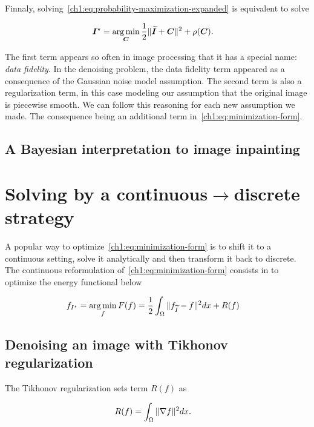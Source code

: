 Finnaly, solving~\cref{ch1:eq:probability-maximization-expanded} is equivalent to solve

\begin{align}
	\bm{I}^{\star} &= \operatorname*{arg\,min} _{\bm{C}} \frac{1}{2}\lVert\bm{\widetilde{I}} + \bm{C}\rVert^2 + \rho(\bm{C}).
	\label{ch1:eq:minimization-form}
\end{align}

The first term appears so often in image processing that it has a special name: \emph{data fidelity}. In the denoising problem, the data fidelity term appeared as a consequence of the Gaussian noise model assumption. The second term is also a regularization term, in this case modeling our assumption that the original image is piecewise smooth. We can follow this reasoning for each new assumption we made. The consequence being an additional term in~\cref{ch1:eq:minimization-form}.

\subsection{A Bayesian interpretation to image inpainting}

\section{Solving by a continuous$\rightarrow$discrete strategy }

A popular way to optimize~\cref{ch1:eq:minimization-form} is to shift it to a continuous setting, solve it analytically and then transform it back to discrete. The continuous reformulation of~\cref{ch1:eq:minimization-form} consists in to optimize the energy functional below

\begin{align}
	f_{I^{\star}} &= \operatorname*{arg\,min}_{f} F(f) = \frac{1}{2} \int_{\Omega}{ \lVert f_{\widetilde{I}} - f\rVert^2dx} + R(f)
	\label{ch1:eq:variational-formulation}
\end{align}

\subsection{Denoising an image with Tikhonov regularization}

The Tikhonov regularization sets term $R(f)$ as

\begin{align*}
	R(f) &= \int_{\Omega}{ \lVert \nabla f \rVert^2 dx }.
\end{align*}


